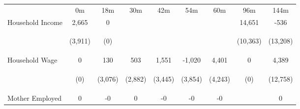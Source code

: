 \begin{tabular}{lcccccccc}
\hline \noalign{\smallskip} & 0m & 18m & 30m & 42m & 54m & 60m & 96m & 144m\\
\noalign{\smallskip}\hline \noalign{\smallskip}Household Income & 2,665 & 0 &  &  &  &  & 14,651 & -536\\
 & \begin{footnotesize}(3,911)\end{footnotesize} & \begin{footnotesize}(0)\end{footnotesize} & \begin{footnotesize}\end{footnotesize} & \begin{footnotesize}\end{footnotesize} & \begin{footnotesize}\end{footnotesize} & \begin{footnotesize}\end{footnotesize} & \begin{footnotesize}(10,363)\end{footnotesize} & \begin{footnotesize}(13,208)\end{footnotesize}\\
\noalign{\smallskip}Household Wage & 0 & 130 & 503 & 1,551 & -1,020 & 4,401 & 0 & 4,389\\
 & \begin{footnotesize}(0)\end{footnotesize} & \begin{footnotesize}(3,076)\end{footnotesize} & \begin{footnotesize}(2,882)\end{footnotesize} & \begin{footnotesize}(3,445)\end{footnotesize} & \begin{footnotesize}(3,854)\end{footnotesize} & \begin{footnotesize}(4,243)\end{footnotesize} & \begin{footnotesize}(0)\end{footnotesize} & \begin{footnotesize}(12,758)\end{footnotesize}\\
\noalign{\smallskip}Mother Employed & 0 & -0 & 0 & -0 & -0 & -0 &  & 0\\

\end{tabular}
